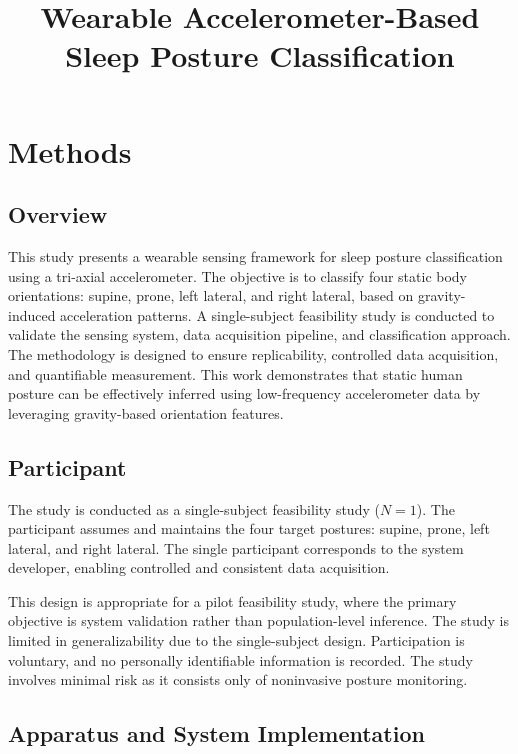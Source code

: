 \documentclass[conference]{IEEEtran}
\begin{document}
\title{Wearable Accelerometer-Based Sleep Posture Classification}

\author{
\IEEEauthorblockA{
}
}

\maketitle

\section{Methods}

\subsection{Overview}

This study presents a wearable sensing framework for sleep posture classification using a tri-axial accelerometer. The objective is to classify four static body orientations: supine, prone, left lateral, and right lateral, based on gravity-induced acceleration patterns. A single-subject feasibility study is conducted to validate the sensing system, data acquisition pipeline, and classification approach. The methodology is designed to ensure replicability, controlled data acquisition, and quantifiable measurement. This work demonstrates that static human posture can be effectively inferred using low-frequency accelerometer data by leveraging gravity-based orientation features.

\subsection{Participant}

The study is conducted as a single-subject feasibility study ($N = 1$). The participant assumes and maintains the four target postures: supine, prone, left lateral, and right lateral. The single participant corresponds to the system developer, enabling controlled and consistent data acquisition.

This design is appropriate for a pilot feasibility study, where the primary objective is system validation rather than population-level inference. The study is limited in generalizability due to the single-subject design. Participation is voluntary, and no personally identifiable information is recorded. The study involves minimal risk as it consists only of noninvasive posture monitoring.

\subsection{Apparatus and System Implementation}
\end{document}
